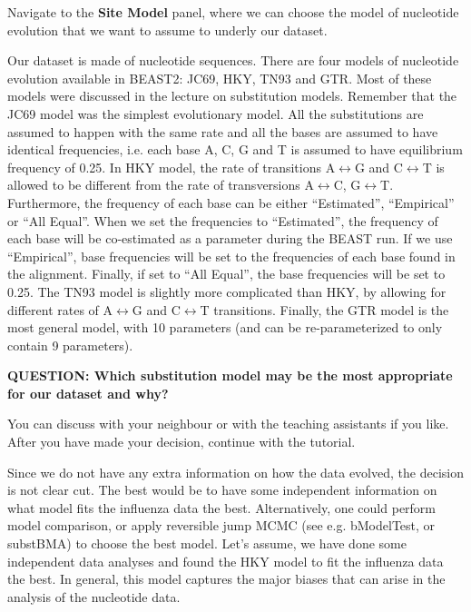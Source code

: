 \documentclass[11pt]{article}
\begin{document}
\begin{framed}
Navigate to the \textbf{Site Model} panel, where we can choose the model of nucleotide evolution that we want to assume to underly our dataset. 
\end{framed}

Our dataset is made of nucleotide sequences. There are four models of nucleotide evolution available in BEAST2: JC69, HKY, TN93 and GTR. Most of these models were discussed in the lecture on substitution models. Remember that the JC69 model was the simplest evolutionary model. All the substitutions are assumed to happen with the same rate and all the bases are assumed to have identical frequencies, i.e. each base A, C, G and T is assumed to have equilibrium frequency of 0.25. In HKY model, the rate of transitions A$\leftrightarrow$G and C$\leftrightarrow$T is allowed to be different from the rate of transversions A$\leftrightarrow$C, G$\leftrightarrow$T. Furthermore, the frequency of each base can be either ``Estimated'', ``Empirical'' or ``All Equal''. When we set the frequencies to ``Estimated'', the frequency of each base will be co-estimated as a parameter during the BEAST run. If we use ``Empirical'', base frequencies will be set to the frequencies of each base found in the alignment. Finally, if set to ``All Equal'', the base frequencies will be set to 0.25. The TN93 model is slightly more complicated than HKY, by allowing for different rates of A$\leftrightarrow$G and C$\leftrightarrow$T transitions. Finally, the GTR model is the most general model, with 10 parameters (and can be re-parameterized to only contain 9 parameters). 

\begin{framed}
{\bf QUESTION: Which substitution model may be the most appropriate for our dataset and why?} 

You can discuss with your neighbour or with the teaching assistants if you like. After you have made your decision, continue with the tutorial.
\end{framed}

Since we do not have any extra information on how the data evolved, the decision is not clear cut. The best would be to have some independent information on what model fits the influenza data the best. Alternatively, one could perform model comparison, or apply reversible jump MCMC (see e.g. bModelTest, or substBMA)  to choose the best model. Let's assume, we have done some independent data analyses and found the HKY model to fit the influenza data the best. In general, this model captures the major biases that can arise in the analysis of the nucleotide data. 
\end{document}
